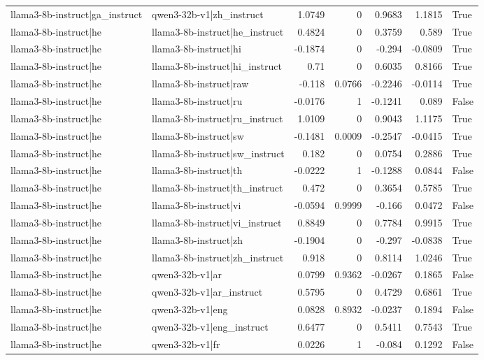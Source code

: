 \begin{table}
\begin{tabular}{l l r r r r l}
llama3-8b-instruct|ga_instruct & qwen3-32b-v1|zh_instruct & 1.0749 & 0 & 0.9683 & 1.1815 & True \\
llama3-8b-instruct|he & llama3-8b-instruct|he_instruct & 0.4824 & 0 & 0.3759 & 0.589 & True \\
llama3-8b-instruct|he & llama3-8b-instruct|hi & -0.1874 & 0 & -0.294 & -0.0809 & True \\
llama3-8b-instruct|he & llama3-8b-instruct|hi_instruct & 0.71 & 0 & 0.6035 & 0.8166 & True \\
llama3-8b-instruct|he & llama3-8b-instruct|raw & -0.118 & 0.0766 & -0.2246 & -0.0114 & True \\
llama3-8b-instruct|he & llama3-8b-instruct|ru & -0.0176 & 1 & -0.1241 & 0.089 & False \\
llama3-8b-instruct|he & llama3-8b-instruct|ru_instruct & 1.0109 & 0 & 0.9043 & 1.1175 & True \\
llama3-8b-instruct|he & llama3-8b-instruct|sw & -0.1481 & 0.0009 & -0.2547 & -0.0415 & True \\
llama3-8b-instruct|he & llama3-8b-instruct|sw_instruct & 0.182 & 0 & 0.0754 & 0.2886 & True \\
llama3-8b-instruct|he & llama3-8b-instruct|th & -0.0222 & 1 & -0.1288 & 0.0844 & False \\
llama3-8b-instruct|he & llama3-8b-instruct|th_instruct & 0.472 & 0 & 0.3654 & 0.5785 & True \\
llama3-8b-instruct|he & llama3-8b-instruct|vi & -0.0594 & 0.9999 & -0.166 & 0.0472 & False \\
llama3-8b-instruct|he & llama3-8b-instruct|vi_instruct & 0.8849 & 0 & 0.7784 & 0.9915 & True \\
llama3-8b-instruct|he & llama3-8b-instruct|zh & -0.1904 & 0 & -0.297 & -0.0838 & True \\
llama3-8b-instruct|he & llama3-8b-instruct|zh_instruct & 0.918 & 0 & 0.8114 & 1.0246 & True \\
llama3-8b-instruct|he & qwen3-32b-v1|ar & 0.0799 & 0.9362 & -0.0267 & 0.1865 & False \\
llama3-8b-instruct|he & qwen3-32b-v1|ar_instruct & 0.5795 & 0 & 0.4729 & 0.6861 & True \\
llama3-8b-instruct|he & qwen3-32b-v1|eng & 0.0828 & 0.8932 & -0.0237 & 0.1894 & False \\
llama3-8b-instruct|he & qwen3-32b-v1|eng_instruct & 0.6477 & 0 & 0.5411 & 0.7543 & True \\
llama3-8b-instruct|he & qwen3-32b-v1|fr & 0.0226 & 1 & -0.084 & 0.1292 & False \\

\end{tabular}
\end{table}

